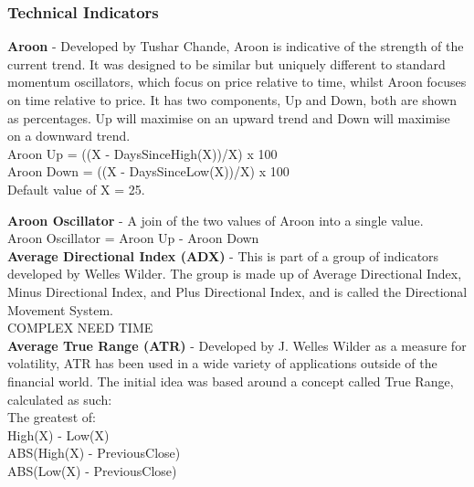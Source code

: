 \documentclass[12pt,a4paper]{article}
\begin{document}
\iffalse
[]
\fi

\iffalse
#################################################################################
\fi

\subsubsection*{Technical Indicators}

\textbf{Aroon} - Developed by Tushar Chande, Aroon is indicative of the strength of the current trend. It was designed to be similar but uniquely different to standard momentum oscillators, which focus on price relative to time, whilst Aroon focuses on time relative to price. It has two components, Up and Down, both are shown as percentages. Up will maximise on an upward trend and Down will maximise on a downward trend.\\

\noindent
Aroon Up = ((X - DaysSinceHigh(X))/X) x 100\\
Aroon Down = ((X - DaysSinceLow(X))/X) x 100\\
Default value of X = 25.

\iffalse
[]
\fi

\noindent
\textbf{Aroon Oscillator} - A join of the two values of Aroon into a single value.\\

\noindent
Aroon Oscillator = Aroon Up - Aroon Down\\

\iffalse
[]
\fi

\noindent
\textbf{Average Directional Index (ADX)} - This is part of a group of indicators developed by Welles Wilder. The group is made up of Average Directional Index, Minus Directional Index, and Plus Directional Index, and is called the Directional Movement System. \\

COMPLEX NEED TIME \\

\iffalse
[]
\fi

\noindent
\textbf{Average True Range (ATR)} - Developed by J. Welles Wilder as a measure for volatility, ATR has been used in a wide variety of applications outside of the financial world. The initial idea was based around a concept called True Range, calculated as such:\\

\noindent
The greatest of:\\
High(X) - Low(X)\\
ABS(High(X) - PreviousClose)\\
ABS(Low(X) - PreviousClose)\\
\end{document}
